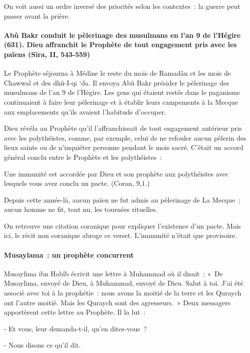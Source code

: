 On voit aussi un ordre inversé des priorités selon les contextes~: la
guerre peut passer avant la prière.

\paragraph{Abû Bakr conduit le pèlerinage des musulmans en l'an 9 de l'Hégire
(631). Dieu affranchit le Prophète de tout engagement pris avec les
païens (Sīra, II, 543-559)}

{Le Prophète séjourna à Médine le reste du mois de Ramadân et les
mois de Chawwal et des dhû-I-qi `da. Il envoya Abû Bakr présider le
pèlerinage des musulmans de l'an 9 de l'Hégire. Les gens qui étaient
restés dans le paganisme continuaient à faire leur pèlerinage et à
établir leurs campements à la Mecque aux emplacements qu'ils avaient
l'habitude d'occuper.}

{Dieu révéla au Prophète qu'il l'affranchissait de tout engagement
antérieur pris avec les polythéistes, comme, par exemple, celui de ne
refouler aucun pèlerin des lieux saints ou de n'inquiéter personne
pendant le mois sacré. C'était un accord général conclu entre le
Prophète et les polythéistes~:}

{Une immunité est accordée par Dieu et son prophète aux
polythéistes avec lesquels vous avez conclu un pacte. (Coran, 9,1.)}

{Depuis cette année-là, aucun païen ne fut admis au pèlerinage de
La Mecque~; aucun homme ne fit, tout nu, les tournées rituelles.}

On retrouve une citation coranique pour expliquer l'existence d'un
pacte. Mais ici, le récit non coranique abroge ce verset. L'immunité
n'était que provisoire.


\paragraph{Musaylama~: un prophète
concurrent}

{Musaylima ibn Habîb écrivit une lettre à Muhammad où il disait~:
«~De Musaylima, envoyé de Dieu, à Muhammad, envoyé de Dieu. Salut à toi.
J'ai été associé avec toi à la prophétie~: nous avons la moitié de la
terre et les Quraych ont l'autre moitié. Mais les Quraych sont des
agresseurs.~» Deux messagers apportèrent cette lettre au Prophète. Il la
lut~:}

{- Et vous, leur demanda-t-il, qu'en dites-vous~?}

{- Nous disons ce qu'il dit.}

